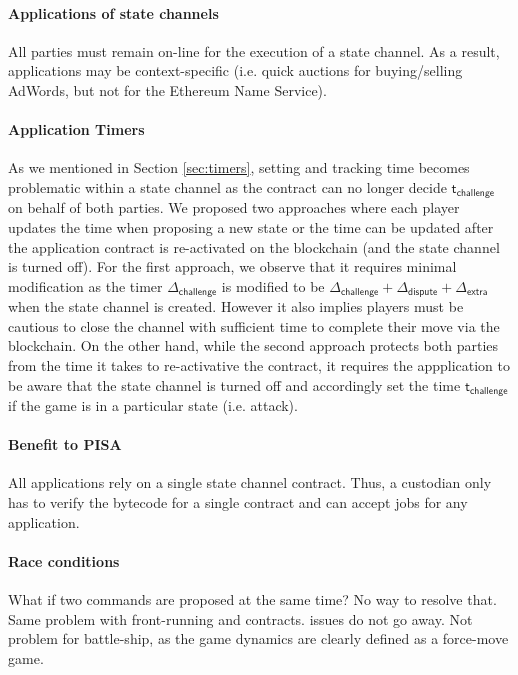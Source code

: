 \documentclass{llncs}
\newcommand{\timerchallenge}{\mathsf{\Delta}_{\mathsf{challenge}}}
\newcommand{\timechallenge}{\mathsf{t}_{\mathsf{challenge}}}
\newcommand{\timerextra}{\mathsf{\Delta}_{\mathsf{extra}}}
\newcommand{\timerdispute}{\mathsf{\Delta}_{\mathsf{dispute}}}
\newcommand{\timenow}{\mathsf{t}_{\mathsf{now}}}
\newcommand{\timedispute}{\timenow + \mathsf{\Delta}_{\mathsf{dispute}}}
\begin{document}
\paragraph{Applications of state channels} All parties must remain on-line for the execution of a state channel. As a result, applications may be context-specific (i.e. quick auctions for buying/selling AdWords, but not for the Ethereum Name Service). 

\paragraph{Application Timers} 

As we mentioned in Section \ref{sec:timers}, setting and tracking time becomes problematic within a state channel as the contract can no longer decide $\timechallenge$ on behalf of both parties.
We proposed two approaches where each player updates the time when proposing a new state or the time can be updated after the application contract is re-activated on the blockchain (and the state channel is turned off).  
For the first approach, we observe that it requires minimal modification as the timer $\timerchallenge$ is modified to be $\timerchallenge + \timerdispute + \timerextra$ when the state channel is created.
However it also implies players must be cautious to close the channel with sufficient time to complete their move via the blockchain.
On the other hand, while the second approach protects both parties from the time it takes to re-activative the contract, it requires the appplication to be aware that the state channel is turned off and accordingly set the time $\timechallenge$ if the game is in a particular state (i.e. attack). 

\paragraph{Benefit to PISA} All applications rely on a single state channel contract. Thus, a custodian only has to verify the bytecode for a single contract and can accept jobs for any application. 

\paragraph{Race conditions} What if two commands are proposed at the same time? No way to resolve that. Same problem with front-running and contracts. issues do not go away. Not problem for battle-ship, as the game dynamics are clearly defined as a force-move game. 
\end{document}
